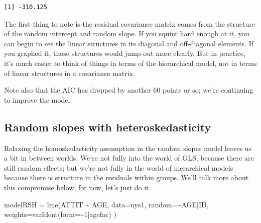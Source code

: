 \documentclass[
  letterpaper,
  DIV=11,
  numbers=noendperiod]{scrreprt}
\newenvironment{Shaded}{\begin{snugshade}}{\end{snugshade}}
\newcommand{\AttributeTok}[1]{\textcolor[rgb]{0.49,0.56,0.16}{#1}}
\newcommand{\DecValTok}[1]{\textcolor[rgb]{0.25,0.63,0.44}{#1}}
\newcommand{\FunctionTok}[1]{\textcolor[rgb]{0.02,0.16,0.49}{#1}}
\newcommand{\NormalTok}[1]{\textcolor[rgb]{0.00,0.44,0.13}{#1}}
\newcommand{\OtherTok}[1]{\textcolor[rgb]{0.00,0.44,0.13}{#1}}
\newcommand{\SpecialCharTok}[1]{\textcolor[rgb]{0.25,0.44,0.63}{#1}}
\begin{document}
\begin{Shaded}
\end{Shaded}

\begin{verbatim}
[1] -310.125
\end{verbatim}

The first thing to note is the residual covariance matrix comes from the
structure of the random intercept and random slope. If you squint hard
enough at it, you can begin to see the linear structures in its diagonal
and off-diagonal elements. If you graphed it, those structures would
jump out more clearly. But in practice, it's much easier to think of
things in terms of the hierarchical model, not in terms of linear
structures in a covariance matrix.

Note also that the AIC has dropped by another 60 points or so; we're
continuing to improve the model.

\hypertarget{random-slopes-with-heteroskedasticity}{%
\subsection{Random slopes with
heteroskedasticity}\label{random-slopes-with-heteroskedasticity}}

Relaxing the homoskedasticity assumption in the random slopes model
leaves us a bit in between worlds. We're not fully into the world of
GLS, because there are still random effects; but we're not fully in the
world of hierarchical models because there is structure in the residuals
within groups. We'll talk more about this compromise below; for now,
let's just do it.

\begin{Shaded}
\begin{Highlighting}[]
\NormalTok{modelRSH }\OtherTok{=} \FunctionTok{lme}\NormalTok{(ATTIT }\SpecialCharTok{\textasciitilde{}}\NormalTok{ AGE, }
              \AttributeTok{data=}\NormalTok{nys1,}
              \AttributeTok{random=}\SpecialCharTok{\textasciitilde{}}\NormalTok{AGE}\SpecialCharTok{|}\NormalTok{ID,}
              \AttributeTok{weights=}\FunctionTok{varIdent}\NormalTok{(}\AttributeTok{form=}\SpecialCharTok{\textasciitilde{}}\DecValTok{1}\SpecialCharTok{|}\NormalTok{agefac) )}
\end{Highlighting}
\end{Shaded}
\end{document}

